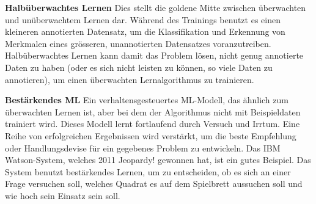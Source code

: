 \begin{lpu}
\begin{artikelbox}
\textbf{Halbüberwachtes Lernen}
Dies stellt die goldene Mitte zwischen überwachten und unüberwachtem Lernen dar. Während des Trainings benutzt es einen kleineren annotierten Datensatz, um die Klassifikation und Erkennung von Merkmalen eines grösseren, unannotierten Datensatzes voranzutreiben. Halbüberwachtes Lernen kann damit das Problem lösen, nicht genug annotierte Daten zu haben (oder es sich nicht leisten zu können, so viele Daten zu annotieren), um einen überwachten Lernalgorithmus zu trainieren.

\textbf{Bestärkendes ML}
Ein verhaltensgesteuertes ML-Modell, das ähnlich zum überwachten Lernen ist, aber bei dem der Algorithmus nicht mit Beispieldaten trainiert wird. Dieses Modell lernt fortlaufend durch Versuch und Irrtum. Eine Reihe von erfolgreichen Ergebnissen wird verstärkt, um die beste Empfehlung oder Handlungsdevise für ein gegebenes Problem zu entwickeln.
Das IBM Watson-System, welches 2011 Jeopardy! gewonnen hat, ist ein gutes Beispiel. Das System benutzt bestärkendes Lernen, um zu entscheiden, ob es sich an einer Frage versuchen soll, welches Quadrat es auf dem Spielbrett aussuchen soll und wie hoch sein Einsatz sein soll.


\end{artikelbox}
\end{lpu}
